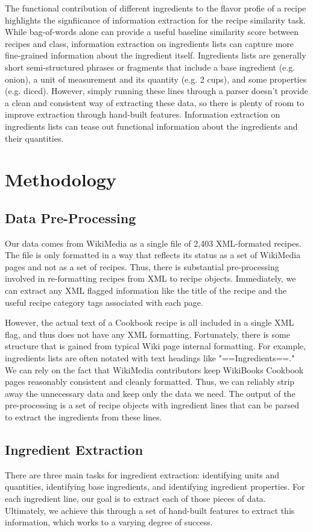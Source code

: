 \documentclass[11pt]{article}
\begin{document}
The functional contribution of different ingredients to the flavor profie of a recipe highlights the signfiicance of information extraction for the recipe similarity task.  While bag-of-words alone can provide a useful baseline similarity score between recipes and class, information extraction on ingredients lists can capture more fine-grained information about the ingredient itself. Ingredients lists are generally short semi-structured phrases or fragments that include a base ingredient (e.g. onion), a unit of measurement and its quantity (e.g. 2 cups), and some properties (e.g. diced). However, simply running these lines through a parser doesn't provide a clean and consistent way of extracting these data, so there is plenty of room to improve extraction through hand-built features. Information extraction on ingredients lists can tease out functional information about the ingredients and their quantities.

\section{Methodology}

\subsection{Data Pre-Processing}
Our data comes from WikiMedia as a single file of 2,403 XML-formated recipes. The file is only formatted in a way that reflects its status as a set of WikiMedia pages and not as a set of recipes. Thus, there is substantial pre-processing involved in re-formatting recipes from XML to recipe objects. Immediately, we can extract any XML flagged information like the title of the recipe and the useful recipe category tags associated with each page. 

However, the actual text of a Cookbook recipe is all included in a single XML flag, and thus does not have any XML formatting. Fortunately, there is some structure that is gained from typical Wiki page internal formatting. For example, ingredients lists are often notated with text headings like "==Ingredients==." We can rely on the fact that WikiMedia contributors keep WikiBooks Cookbook pages reasonably consistent and cleanly formatted. Thus, we can reliably strip away the unnecessary data and keep only the data we need. The output of the pre-processing is a set of recipe objects with ingredient lines that can be parsed to extract the ingredients from these lines.

\subsection{Ingredient Extraction}
There are three main tasks for ingredient extraction: identifying units and quantities, identifying base ingredients, and identifying ingredient properties. For each ingredient line, our goal is to extract each of those pieces of data. Ultimately, we achieve this through a set of hand-built features to extract this information, which works to a varying degree of success. 
\end{document}
